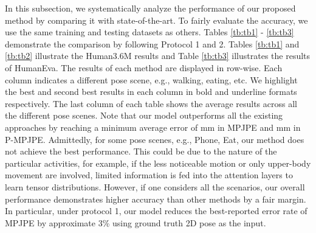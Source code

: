 \documentclass[twocolumn]{svjour3}          \smartqed  \usepackage{graphicx}
\begin{document}
In this subsection, we systematically analyze the performance of our proposed method by comparing it with state-of-the-art. To fairly evaluate the accuracy, we use the same training and testing datasets as others.  Tables \ref{tb:tb1} - \ref{tb:tb3} demonstrate the comparison by following Protocol 1 and 2. Tables \ref{tb:tb1} and \ref{tb:tb2} illustrate the Human3.6M results and Table \ref{tb:tb3} illustrates the results of HumanEva. The results of each method are displayed in row-wise. Each column indicates a different pose scene, e.g., walking, eating, etc. We highlight the best and second best results in each column in bold and underline formats respectively. The last column of each table shows the average results across all the different pose scenes. Note that our model outperforms all the existing approaches by reaching a minimum average error of mm in MPJPE and mm in P-MPJPE.  
Admittedly, for some pose scenes, e.g., Phone, Eat, our method does not achieve the best performance. This could be due to the nature of the particular activities, for example, if the less noticeable motion or only upper-body movement are involved, limited information is fed into the attention layers to learn tensor distributions. However, if one considers all the scenarios, our overall performance demonstrates higher accuracy than other methods by a fair margin. In particular, under protocol 1, our model reduces the best-reported error rate of MPJPE  \citep{Pavllo2019} by approximate 3\% using ground truth 2D pose as the input.
\end{document}
